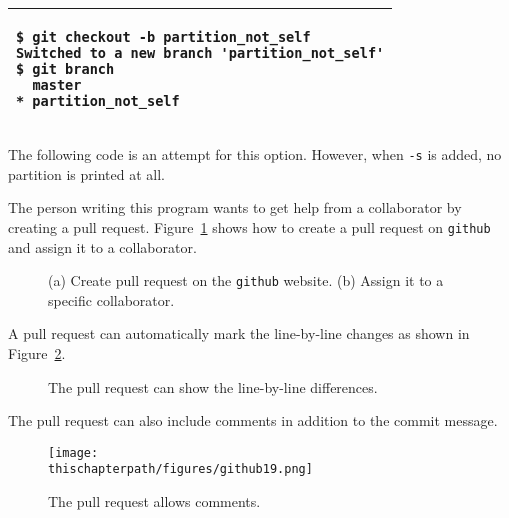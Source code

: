 \vspace{0.2in}
\noindent
\begin{tabular}{|p{5in}|}\hline
\begin{verbatim}
$ git checkout -b partition_not_self
Switched to a new branch 'partition_not_self'
$ git branch
  master
* partition_not_self
\end{verbatim}
\\ \hline
\end{tabular}
\vspace{0.2in}

The following code is an attempt for this option. However,
when {\tt -s} is added, no partition is printed at all.

\resetlinenumber[1]
\linenumbers
\begin{tt}
  
\end{tt}
\nolinenumbers

The person writing this program wants to get help from a collaborator
by creating a pull request.  Figure~\ref{fig:github158} shows how to
create a pull request on {\tt github} and assign it to a collaborator.

\begin{figure}[h] \centering
\caption{(a) Create pull request on the {\tt github} website.
(b) Assign it to a specific collaborator.}
\label{fig:github158}
\end{figure}

\clearpage

A pull request can automatically mark the line-by-line changes
as shown in Figure~\ref{fig:github167}.

\begin{figure}[h] \centering
\caption{The pull request can show the line-by-line differences.}
\label{fig:github167}
\end{figure}

The pull request can also include comments in addition to
the commit message.

\begin{figure}[h] \centering
{\texttt{[image: \\thischapterpath/figures/github19.png]}}
\caption{The pull request allows  comments.}
\label{fig:github19}
\end{figure}




